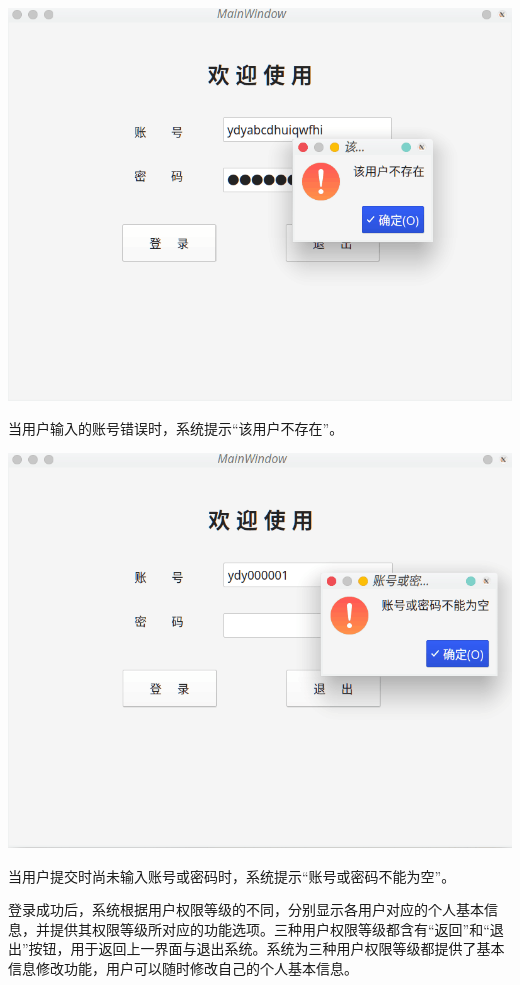 \documentclass[a4paper,UTF8]{article}
\begin{document}
{\centering\includegraphics[width=1\columnwidth]{4.png}
	
}

当用户输入的账号错误时，系统提示“该用户不存在”。

{\centering\includegraphics[width=1\columnwidth]{5.png}
	
}

当用户提交时尚未输入账号或密码时，系统提示“账号或密码不能为空”。

登录成功后，系统根据用户权限等级的不同，分别显示各用户对应的个人基本信息，并提供其权限等级所对应的功能选项。三种用户权限等级都含有“返回”和“退出”按钮，用于返回上一界面与退出系统。系统为三种用户权限等级都提供了基本信息修改功能，用户可以随时修改自己的个人基本信息。
\end{document}
